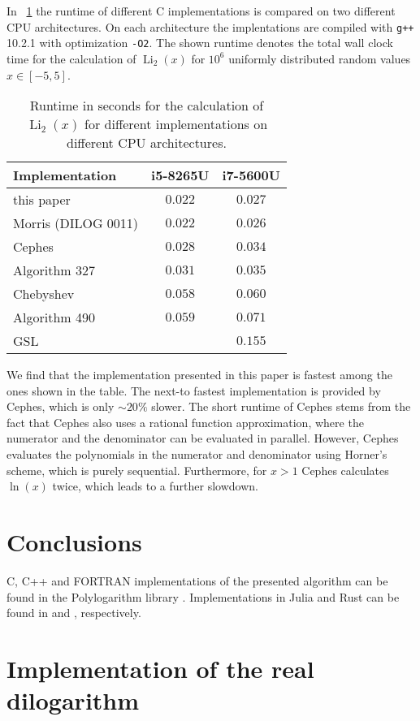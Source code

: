 \documentclass[10pt,DIV16,twocolumn,numbers=noenddot]{scrartcl}
\newcommand{\Li}{\operatorname{Li}_2}
\newcommand{\tabref}[1]{\tablename~\ref{#1}}
\begin{document}
In \tabref{tab:runtime} the runtime of different C implementations is
compared on two different CPU architectures.  On each architecture the
implentations are compiled with \texttt{g++} 10.2.1 with optimization
\texttt{-O2}.  The shown runtime denotes the total wall clock time for
the calculation of $\Li(x)$ for $10^6$ uniformly distributed random
values $x\in[-5,5]$.
%
\begin{table}[tb]
  \centering
  \caption{Runtime in seconds for the calculation of $\Li(x)$ for
    different implementations on different CPU architectures.}
  \begin{tabular}{lcc}
    \toprule
    Implementation & i5-8265U & i7-5600U \\
    \midrule
    this paper & $0.022$ & $0.027$ \\
    Morris (DILOG 0011) \cite{morris} & $0.022$ & $0.026$ \\
    Cephes \cite{cephes} & $0.028$ & $0.034$ \\
    Algorithm 327 \cite{koelbigDilog} & $0.031$ & $0.035$ \\
    Chebyshev \cite{luke} & $0.058$ & $0.060$ \\
    Algorithm 490 \cite{ginsberg} & $0.059$ & $0.071$ \\
    GSL \cite{gsl} & & $0.155$ \\
    \bottomrule
  \end{tabular}
  \label{tab:runtime}
\end{table}
%
We find that the implementation presented in this paper is fastest
among the ones shown in the table.  The next-to fastest implementation
is provided by Cephes, which is only $\sim 20\%$ slower.  The short
runtime of Cephes stems from the fact that Cephes also uses a rational
function approximation, where the numerator and the denominator can be
evaluated in parallel.  However, Cephes evaluates the polynomials in
the numerator and denominator using Horner's scheme, which is purely
sequential.  Furthermore, for $x>1$ Cephes calculates $\ln(x)$ twice,
which leads to a further slowdown.

\section{Conclusions}

C, C++ and FORTRAN implementations of the presented algorithm can be
found in the Polylogarithm library \cite{polylogarithm}.
Implementations in Julia and Rust can be found in \cite{PolyLog.jl}
and \cite{polylog}, respectively.

\appendix

\section{Implementation of the real dilogarithm}






\end{document}
